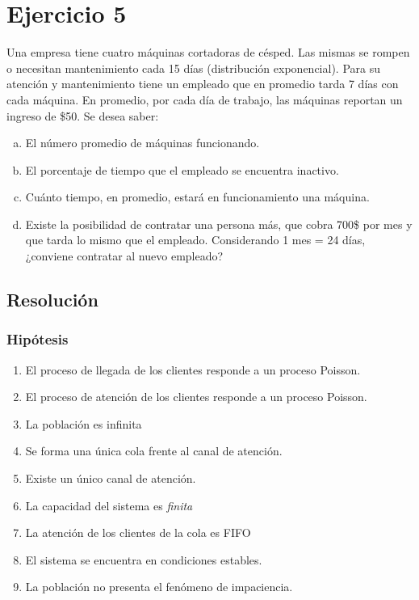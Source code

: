 \documentclass[a4paper,11pt]{article}
\begin{document}
\vspace{35pt}
\leftskip=0pt
\parindent=0pt
\section{\textbf{Ejercicio 5}}

Una empresa tiene cuatro máquinas cortadoras de césped. Las mismas se rompen o
necesitan mantenimiento cada 15 días (distribución exponencial). Para su
atención y mantenimiento tiene un empleado que en promedio tarda 7 días con
cada máquina. En promedio, por cada día de trabajo, las máquinas reportan un
ingreso de \$50. Se desea saber:
\begin{enumerate}[a)]
  \item El número promedio de máquinas funcionando.
  \item El porcentaje de tiempo que el empleado se encuentra inactivo.
  \item Cuánto tiempo, en promedio, estará en funcionamiento una máquina.
  \item Existe la posibilidad de contratar una persona más, que cobra 700\$ por
    mes y que tarda lo mismo que el empleado. Considerando 1 mes = 24 días,
    ¿conviene contratar al nuevo empleado?
\end{enumerate}


\vspace{13pt}
\leftskip=0pt
\parindent=0pt
\subsection{\textbf{Resolución}}

\vspace{21pt}
\subsubsection*{Hipótesis}

\leftskip=36pt
\parindent=-18pt
\begin{enumerate}[1.]
  \item El proceso de llegada de los clientes responde a un proceso Poisson.
  \item El proceso de atención de los clientes responde a un proceso Poisson.
  \item La población es infinita
  \item Se forma una única cola frente al canal de atención.
  \item Existe un único canal de atención.
  \item La capacidad del sistema es \textit{finita}
  \item La atención de los clientes de la cola es FIFO
  \item El sistema se encuentra en condiciones estables.
  \item La población no presenta el fenómeno de impaciencia.
\end{enumerate}
\end{document}

